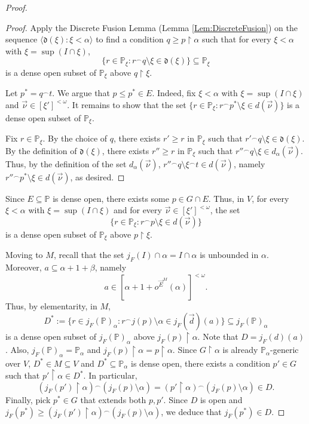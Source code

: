 \documentclass{article}
\theoremstyle{definition}
\theoremstyle{plain}
\newcommand{\po}{\mathbb{P}}
\newcommand{\la}{\langle}
\newcommand{\ra}{\rangle}
\newcommand{\uhr}{\upharpoonright}
\begin{document}
\begin{proof}
\begin{proof}
        Apply the Discrete Fusion Lemma (Lemma \ref{Lem:DiscreteFusion}) on the sequence $\la \mathfrak{d}(\xi) \colon \xi<\alpha \ra$ to find a condition $q\geq p\uhr \alpha$ such that for every $\xi<\alpha$ with $\xi = \sup(I\cap \xi)$,
        $$ \{ r\in \po_\xi \colon r{}^\frown q\setminus \xi \in \mathfrak{d}(\xi) \}\subseteq \po_\xi $$
        is a dense open subset of $\po_\xi$ above $q\uhr \xi$. 
        
        Let $p^* = q{}^\frown t$. We argue that $p\leq p^*\in E$. Indeed, fix $\xi<\alpha$ with $\xi =\sup(I\cap \xi)$ and $\vec{\nu}\in [\xi']^{<\omega}$. It remains to show that the set $\{r\in \po_\xi \colon r{}^\frown p^*\setminus \xi \in d(\vec{\nu}) \}$ is a dense open subset of $\po_\xi$. 
        
        Fix $r\in \po_\xi$. By the choice of $q$, there exists $r'\geq r$ in $\po_\xi$ such that $r'{}^\frown q\setminus \xi\in \mathfrak{d}(\xi)$. By the definition of $\mathfrak{d}(\xi)$, there exists $r''\geq r$ in $\po_\xi$ such that ${r''}{}^\frown q\setminus \xi\in d_\alpha(\vec{\nu})$. Thus, by the definition of the set $d_\alpha(\vec{\nu})$, ${r''}{}^\frown q\setminus \xi{}^\frown t\in d(\vec{\nu})$, namely ${r''}{}^\frown p^*\setminus \xi \in d(\vec{\nu})$, as desired.
        \end{proof}
        Since $E\subseteq \po$ is dense open, there exists some $p\in G\cap E$. Thus, in $V$, for every $\xi<\alpha$ with $\xi = \sup(I\cap \xi)$ and for every $\vec{\nu}\in [\xi' ]^{<\omega}$, the set
        $$ \{  r\in \po_\xi \colon r{}^\frown p\setminus \xi\in d(\vec{\nu}) \} $$
        is a dense open subset of $\po_\xi$ above $p\uhr \xi$. 

        Moving to $M$, recall that the set  $j_F(I)\cap\alpha=I\cap\alpha$ is unbounded in $\alpha$.   Moreover, $a\subseteq \alpha+1+\beta$, namely 
        $$a\in\left[ \alpha+1+o^{{\vec{E}}^M}(\alpha)\right]^{<\omega}.$$
        Thus, by elementarity, in $M$,
        $$D^* := \{ r\in j_F(\po)_\alpha \colon r{}^\frown j(p)\setminus \alpha \in j_F(\vec{d})(a) \}\subseteq j_F(\po)_\alpha $$
        is a dense open subset of $j_F(\po)_\alpha$ above $j_F(p)\uhr \alpha$. Note that $D = j_F(d)(a)$. Also, $j_F(\po)_\alpha = \po_\alpha$ and $j_F(p)\uhr \alpha = p\uhr \alpha$. Since $G\uhr \alpha$ is already $\po_\alpha$-generic over $V$, $D^*\in M\subseteq V$ and $D^*\subseteq \po_\alpha$ is dense open, there exists a condition $p'\in G$ such that $p'\uhr \alpha\in D^*$. In particular, 
        $$ (j_F(p')\uhr \alpha){}^\frown (j_F(p)\setminus \alpha) = (p'\uhr \alpha){}^\frown (j_F(p)\setminus \alpha)  \in D. $$
        Finally, pick $p^*\in G$ that extends both $p, p'$. Since $D$ is open and $j_F(p^*)\geq (j_F(p')\uhr \alpha){}^\frown (j_F(p)\setminus \alpha)$, we deduce that $j_F(p^*)\in D$. 
    \end{proof}
\end{document}
